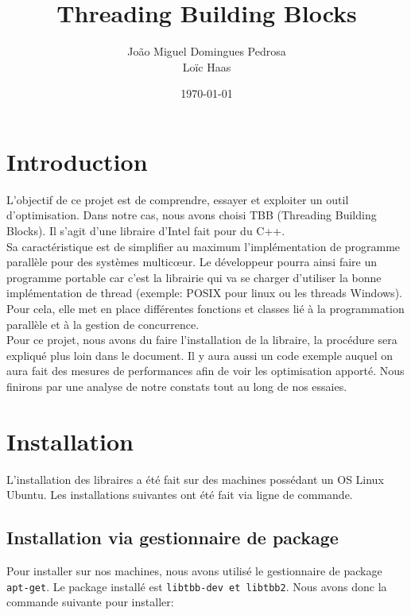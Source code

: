 \documentclass[10pt,a4paper]{article}
\author{João Miguel Domingues Pedrosa \\ Loïc Haas}
\title{Threading Building Blocks}
\date{\today}
\begin{document}
\maketitle
\newpage
\tableofcontents
\newpage


\section{Introduction}
L'objectif de ce projet est de comprendre, essayer et exploiter un outil d'optimisation. Dans notre cas, nous avons choisi TBB (Threading Building Blocks). Il s'agit d'une libraire d'Intel fait pour du C++. \\

Sa caractéristique est de simplifier au maximum l'implémentation de programme parallèle pour des systèmes multicœur. Le développeur pourra ainsi faire un programme portable car c'est la librairie qui va se charger d'utiliser la bonne implémentation de thread (exemple: POSIX pour linux ou les threads Windows). Pour cela, elle met en place différentes fonctions et classes lié à la programmation parallèle et à la gestion de concurrence.\\

Pour ce projet, nous avons du faire l'installation de la libraire, la procédure sera expliqué plus loin dans le document. Il y aura aussi un code exemple auquel on aura fait des mesures de performances afin de voir les optimisation apporté. Nous finirons par une analyse de notre constats tout au long de nos essaies.
\newpage

\section{Installation}
L'installation des libraires a été fait sur des machines possédant un OS Linux Ubuntu. Les installations suivantes ont été fait via ligne de commande.

\subsection{Installation via gestionnaire de package}

Pour installer sur nos machines, nous avons utilisé le gestionnaire de package \texttt{apt-get}. Le package installé est \texttt{libtbb-dev et libtbb2}. Nous avons donc la commande suivante pour installer:\\
\end{document}
